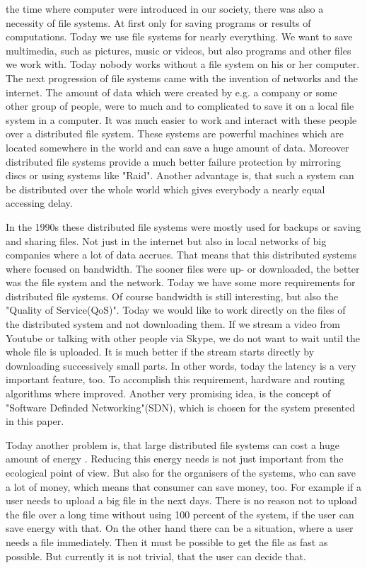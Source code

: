  the time where computer were introduced in our society, there was also a necessity of file systems. At first only for saving programs or results of computations. Today we use file systems for nearly everything. We want to save multimedia, such as pictures, music or videos, but also programs and other files we work with. Today nobody works without a file system on his or her computer. The next progression of file systems came with the invention of networks and the internet. The amount of data which were created by e.g. a company or some other group of people, were to much and to complicated to save it on a local file system in a computer. It was much easier to work and interact with these people over a distributed file system. These systems are powerful machines which are located somewhere in the world and can save a huge amount of data. Moreover distributed file systems provide a much better failure protection by mirroring discs or using systems like "Raid". Another advantage is, that such a system can be distributed over the whole world which gives everybody a nearly equal accessing delay. 

In the 1990s these distributed file systems were mostly used for backups or saving and sharing files. Not just in the internet but also in local networks of big companies where a lot of data accrues. That means that this distributed systems where focused on bandwidth. The sooner files were up- or downloaded, the better was the file system and the network. Today we have some more requirements for distributed file systems. Of course bandwidth is still interesting, but also the "Quality of Service(QoS)". Today we would like to work directly on the files of the distributed system and not downloading them. If we stream a video from Youtube or talking with other people via Skype, we do not want to wait until the whole file is uploaded. It is much better if the stream starts directly by downloading successively small parts. In other words, today the latency is a very important feature, too. To accomplish this requirement, hardware and routing algorithms where improved. Another very promising idea, is the concept of "Software Definded Networking"(SDN), which is chosen for the system presented in this paper.

Today another problem is, that large distributed file systems can cost a huge amount of energy . Reducing this energy needs is not just important from the ecological point of view. But also for the organisers of the systems, who can save a lot of money, which means that consumer can save money, too. For example if a user needs to upload a big file in the next days. There is no reason not to upload the file over a long time without using 100 percent of the system, if the user can save energy with that. On the other hand there can be a situation, where a user needs a file immediately. Then it must be possible to get the file as fast as possible. But currently it is not trivial, that the user can decide that.  

